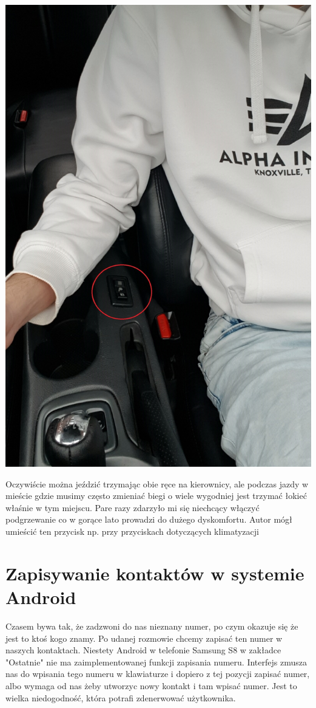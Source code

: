 \documentclass{article}
\begin{document}
\begin{center}
    \includegraphics[scale=0.07]{Celica2.jpg}
\end{center}

Oczywiście można jeździć trzymając obie ręce na kierownicy, ale podczas jazdy w mieście gdzie musimy często
zmieniać biegi o wiele wygodniej jest trzymać łokieć właśnie w tym miejscu. Pare razy zdarzyło mi się niechcący włączyć podgrzewanie co w gorące lato prowadzi do dużego dyskomfortu. Autor mógł umieścić ten przycisk np.
przy przyciskach dotyczących klimatyzacji

\newpage
\section{Zapisywanie kontaktów w systemie Android}
Czasem bywa tak, że zadzwoni do nas nieznany numer, po czym okazuje się że jest to ktoś kogo znamy. Po udanej rozmowie chcemy zapisać ten numer w naszych kontaktach. Niestety Android w telefonie Samsung S8 w zakładce
"Ostatnie" nie ma zaimplementowanej funkcji zapisania numeru. Interfejs zmusza nas do wpisania tego numeru w klawiaturze i dopiero z tej pozycji zapisać numer, albo wymaga od nas żeby utworzyc nowy kontakt i 
tam wpisać numer. Jest to wielka niedogodność, która potrafi zdenerwować użytkownika.
\end{document}
